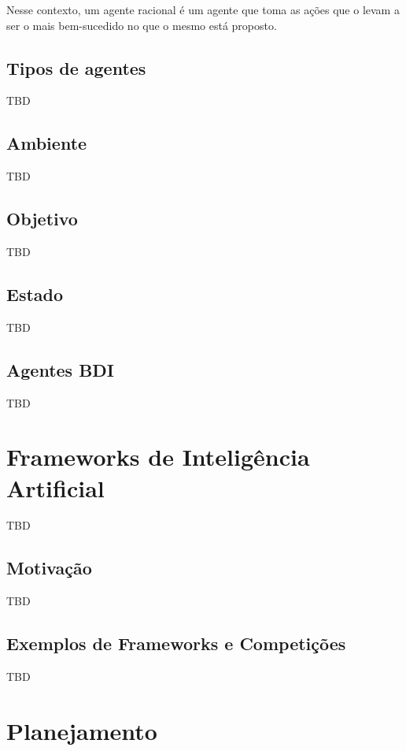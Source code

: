 Nesse contexto, um agente racional é um agente que toma as ações que o levam a
ser o mais bem-sucedido no que o mesmo está proposto.

\subsection{Tipos de agentes}

TBD

\subsection{Ambiente}

TBD

\subsection{Objetivo}

TBD

\subsection{Estado}

TBD

\subsection{Agentes BDI}

TBD

\section{Frameworks de Inteligência Artificial}

TBD

\subsection{Motivação}

TBD

\subsection{Exemplos de Frameworks e Competições}

TBD

\section{Planejamento}

